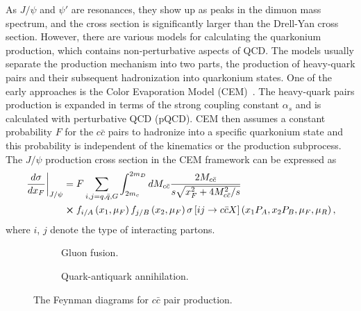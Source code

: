\documentclass[../main.tex]{subfiles}
\begin{document}
As $J/\psi$ and $\psi'$ are resonances, they show up as peaks in the dimuon mass spectrum,
and the cross section is significantly larger than the Drell-Yan cross section.
However, there are various models for calculating the quarkonium production,
which contains non-perturbative aspects of QCD.
The models usually separate the production
mechanism into two parts, the production of heavy-quark pairs and their subsequent
hadronization into quarkonium states. One of the early approaches is the Color
Evaporation Model (CEM)~\cite{einhorn1975,bodwin1995}. The heavy-quark
pairs production is expanded in terms of the strong coupling constant $\alpha_s$
and is calculated with perturbative QCD (pQCD). CEM then assumes a constant
probability $F$ for the $c\bar{c}$ pairs to hadronize into a specific quarkonium
state and this probability is independent of the kinematics or the production
subprocess. The $J/\psi$ production cross section in the CEM framework can be
expressed as
\begin{equation}
	\begin{split}
		\left.\frac{d\sigma}{dx_F}\right|_{J/\psi} & = F \sum_{i,j = q,\bar{q},G}\int^{2m_D}_{2m_c} dM_{c\bar{c}}  \frac{2M_{c\bar{c}}}{s\sqrt{x_F^2+4M_{c\bar{c}}^2/s}}                                 \\
		                                           & \cross f_{i/A}\left(x_1,\mu_F\right)f_{j/B}\left(x_2,\mu_F\right)\sigma\left[ij\rightarrow c\bar{c}X\right]\left(x_1P_A,x_2P_B,\mu_F,\mu_R \right),
	\end{split}
\end{equation}
where $i$, $j$ denote the type of interacting partons.
\begin{figure}[htpb!]
	\centering
	\begin{subfigure}[c]{0.4\linewidth}
		\begin{subfigure}[c]{\linewidth}
			
		\end{subfigure}
		\begin{subfigure}[c]{\linewidth}
			
		\end{subfigure}
		\caption{Gluon fusion\label{subfig:gluon}.}
	\end{subfigure}
	\quad
	\begin{subfigure}[c]{0.4\linewidth}
		
		\caption{Quark-antiquark annihilation.\label{subfig:qqbar}}
	\end{subfigure}
	\caption{The Feynman diagrams for $c\bar{c}$ pair production.}
	\label{fig:charmonium}
\end{figure}
\end{document}
